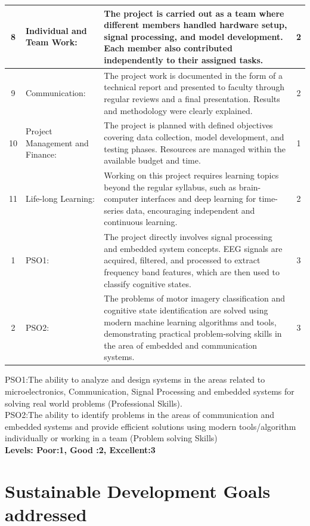 \begin{appendices}
\begin{longtable}{|c|p{4cm}|p{7.5cm}|c|}
\hline
8 & Individual and Team Work: & The project is carried out as a team where different members handled hardware setup, signal processing, and model development. Each member also contributed independently to their assigned tasks. & 2 \\
\hline
9 & Communication: & The project work is documented in the form of a technical report and presented to faculty through regular reviews and a final presentation. Results and methodology were clearly explained. & 2 \\
\hline
10 & Project Management and Finance: & The project is planned with defined objectives covering data collection, model development, and testing phases. Resources are managed within the available budget and time. & 1 \\
\hline
11 & Life-long Learning: & Working on this project requires learning topics beyond the regular syllabus, such as brain-computer interfaces and deep learning for time-series data, encouraging independent and continuous learning. & 2 \\
\hline
1 & PSO1: & The project directly involves signal processing and embedded system concepts. EEG signals are acquired, filtered, and processed to extract frequency band features, which are then used to classify cognitive states. & 3 \\
\hline
2 & PSO2: & The problems of motor imagery classification and cognitive state identification are solved using modern machine learning algorithms and tools, demonstrating practical problem-solving skills in the area of embedded and communication systems. & 3 \\
\hline
\end{longtable}


PSO1:The ability to analyze and design systems in the areas related to microelectronics, Communication, Signal Processing and embedded systems for solving real world problems (Professional Skills).\\
PSO2:The ability to identify problems in the areas of communication and embedded systems and provide efficient solutions using modern tools/algorithm individually or working in a team (Problem solving Skills)
 \\ {\bf Levels: Poor:1, Good :2, Excellent:3}



\chapter[Sustainable Development Goals addressed]{Sustainable Development Goals\\ addressed}
\begin{table}[H]
\centering
\renewcommand{\arraystretch}{1.4}
\setlength{\tabcolsep}{4pt}


\end{table}
\end{appendices}
